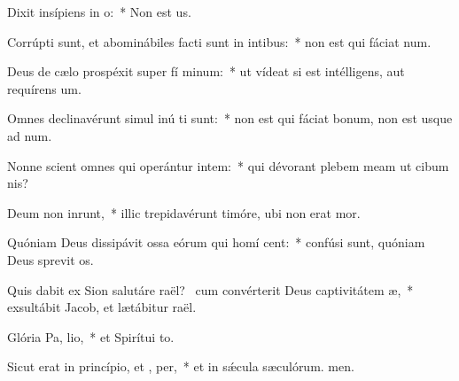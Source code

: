 \item Dixit insípiens in  o:~* Non est us.
\item Corrúpti sunt, et abominábiles facti sunt in intibus:~* non est qui fáciat num.
\item Deus de cælo prospéxit super fí minum:~* ut vídeat si est intélligens, aut requírens um.
\item Omnes declinavérunt simul inú ti sunt:~* non est qui fáciat bonum, non est usque ad num.
\item Nonne scient omnes qui operántur intem:~* qui dévorant plebem meam ut cibum nis?
\item Deum non inrunt,~* illic trepidavérunt timóre, ubi non erat mor.
\item Quóniam Deus dissipávit ossa eórum qui homí cent:~* confúsi sunt, quóniam Deus sprevit os.
\item Quis dabit ex Sion salutáre raël?~\pscross{} cum convérterit Deus captivitátem  æ,~* exsultábit Jacob, et lætábitur raël.
\item Glória Pa,  lio,~* et Spirítui to.
\item Sicut erat in princípio, et ,  per,~* et in sǽcula sæculórum. men.
